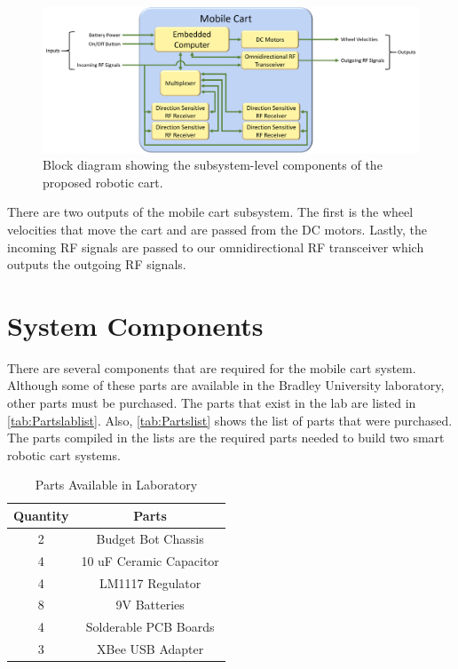 \begin{figure}[H]
  \centering
  \includegraphics[width=\textwidth]{figs/img/mobileCartBlockDiagram.png}
  \caption{Block diagram showing the subsystem-level components of the proposed robotic cart.}
  \label{fig:mobile_block_diag}
\end{figure}

\vspace*{12pt}
\noindent
There are two outputs of the mobile cart subsystem. The first is the wheel velocities that move the cart and are passed from the DC motors. Lastly, the incoming RF signals are passed to our omnidirectional RF transceiver which outputs the outgoing RF signals.


\section{System Components}
\label{sec:System Components}

There are several components that are required for the mobile cart system.
Although some of these parts are available in the Bradley University laboratory,
other parts must be purchased. The parts that exist in the lab are listed in
\autoref{tab:Partslablist}. Also, \autoref{tab:Partslist} shows the list of
parts that were purchased. The parts compiled in the lists are the required
parts needed to build two smart robotic cart systems.

\begin{table}[h!]
  \centering
  \caption{Parts Available in Laboratory}
  \begin{tabular}{c|c}
      \toprule
      \textbf{Quantity} & \textbf{Parts}\\
      \toprule
      2 & Budget Bot Chassis\\
      4 & 10 uF Ceramic Capacitor\\
      4 & LM1117 Regulator\\
      8 & 9V Batteries\\
      4 & Solderable PCB Boards\\
      3 & XBee USB Adapter\\
      \bottomrule
  \end{tabular}
  \label{tab:Partslablist}
\end{table}

